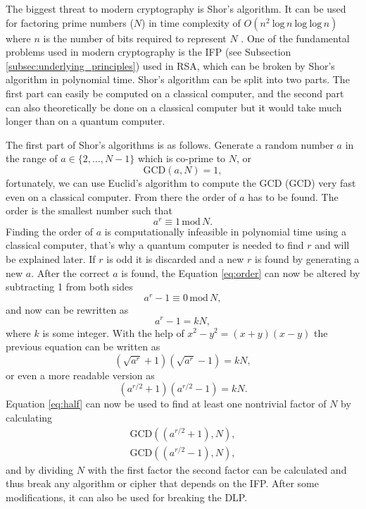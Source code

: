 The biggest threat to modern cryptography is Shor's algorithm. It can be used for factoring prime numbers ($N$) in time complexity of $O(n^2\ \mathrm{log}\,n\ \mathrm{log}\ \mathrm{log}\,n)$ where $n$ is the number of bits required to represent $N$ \cite{Yanofsky2008}. One of the fundamental problems used in modern cryptography is the IFP (see Subsection \ref{subsec:underlying_principles}) used in RSA, which can be broken by Shor's algorithm in polynomial time. Shor's algorithm can be split into two parts. The first part can easily be computed on a classical computer, and the second part can also theoretically be done on a classical computer but it would take much longer than on a quantum computer.

The first part of Shor's algorithms is as follows. Generate a random number $a$ in the range of $a\in\{2,\dots,N-1\}$ which is co-prime to $N$, or
\begin{equation}
  \mathrm{GCD}(a, N) = 1,
\end{equation}
fortunately, we can use Euclid's algorithm to compute the GCD (\acl{GCD}) very fast even on a classical computer. From there the order of $a$ has to be found. The order is the smallest number such that
\begin{equation}
  \label{eq:order}
  a^r \equiv 1\,\mathrm{mod}\,N.
\end{equation}
Finding the order of $a$ is computationally infeasible in polynomial time using a classical computer, that's why a quantum computer is needed to find $r$ and will be explained later. If $r$ is odd it is discarded and a new $r$ is found by generating a new $a$. After the correct $a$ is found, the Equation \ref{eq:order} can now be altered by subtracting 1 from both sides
\begin{equation}
  a^r -1\equiv 0\,\mathrm{mod}\,N,
\end{equation}
and now can be rewritten as
\begin{equation}
  a^r -1=kN,
\end{equation}
where $k$ is some integer. With the help of $x^2 - y^2=(x+y)(x-y)$ the previous equation can be written as
\begin{equation}
  (\sqrt{a^r}+1)(\sqrt{a^r}-1)= kN,
\end{equation}
or even a more readable version as
\begin{equation}
  \label{eq:half}
  (a^{r/2}+1)(a^{r/2}-1)= kN.
\end{equation}
Equation \ref{eq:half} can now be used to find at least one nontrivial factor of $N$ by calculating
\begin{equation}
  \begin{aligned}
    \mathrm{GCD}((a^{r/2}+1), N), \\
    \mathrm{GCD}((a^{r/2}-1), N),
  \end{aligned}
\end{equation}
and by dividing $N$ with the first factor the second factor can be calculated and thus break any algorithm or cipher that depends on the IFP. After some modifications, it can also be used for breaking the DLP. \cite{Yanofsky2008}\cite{Pittenger2000}

